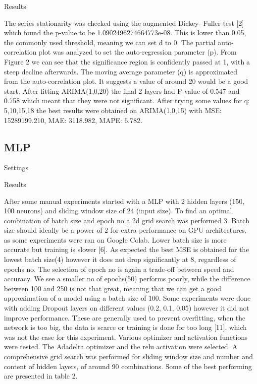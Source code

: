 Results

The series stationarity was checked using the augmented Dickey-
Fuller test [2] which found the p-value to be 1.0902496274664773e-08. This is lower than
0.05, the commonly used threshold, meaning we can set d to 0.
The partial auto-correlation plot was analyzed to set the auto-regression parameter (p).
From Figure 2 we can see that the significance region is confidently passed at 1, with a
steep decline afterwards. The moving average parameter (q) is approximated from the
auto-correlation plot. It suggests a value of around 20 would be a good start. After fitting
ARIMA(1,0,20) the final 2 layers had P-value of 0.547 and 0.758 which meant that they
were not significant. After trying some values for q: 5,10,15,18 the best results were
obtained on ARIMA(1,0,15) with MSE: 15289199.210, MAE: 3118.982, MAPE: 6.782.


\subsection{MLP}
Settings

Results

After some manual experiments started with a MLP with 2 hidden layers (150, 100 neurons)
and sliding window size of 24 (input size).
To find an optimal combination of batch size and epoch no a 2d grid search was
performed 3. Batch size should ideally be a power of 2 for extra performance on GPU
architectures, as some experiments were ran on Google Colab. Lower batch size is more
accurate but training is slower [6]. As expected the best MSE is obtained for the lowest
batch size(4) however it does not drop significantly at 8, regardless of epochs no. The
selection of epoch no is again a trade-off between speed and accuracy. We see a smaller no
of epochs(50) performs poorly, while the difference between 100 and 250 is not that great,
meaning that we can get a good approximation of a model using a batch size of 100.
Some experiments were done with adding Dropout layers on different values (0.2,
0.1, 0.05) however it did not improve performance. These are generally used to prevent
overfitting, when the network is too big, the data is scarce or training is done for too
long [11], which was not the case for this experiment.
Various optimizer and activation functions were tested. The Adadelta optimizer and
the relu activation were selected. A comprehensive grid search was performed for sliding
window size and number and content of hidden layers, of around 90 combinations. Some
of the best performing are presented in table 2.

